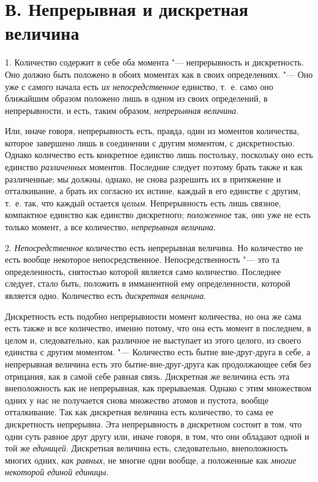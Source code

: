 \label{bkm:bm88b}
\section[В. Непрерывная и дискретная величина]{В. Непрерывная и дискретная величина}

1. Количество содержит в себе оба момента "--- непрерывность и дискретность.
Оно должно быть положено в обоих моментах как в своих определениях. "--- Оно
уже с самого начала есть {\em их непосредственное}
единство, т.~е. само оно ближайшим образом положено лишь в одном из своих
определений, в непрерывности, и есть, таким образом,
{\em непрерывная величина}.

Или, иначе говоря, непрерывность есть, правда, один из моментов количества,
которое завершено лишь в соединении с другим моментом, с дискретностью.
Однако количество есть конкретное единство лишь постольку, поскольку оно
есть единство {\em различенных} моментов. Последние
следует поэтому брать также и как различенные; мы должны, однако, не снова
разрешить их в притяжение и отталкивание, а брать их согласно их истине,
каждый в его единстве с другим, т.~е. так, что каждый остается
{\em целым}. Непрерывность есть лишь связное,
компактное единство как единство дискретного;
{\em положенное} так, оно уже не есть только момент, а
все количество, {\em непрерывная величина}.

2. {\em Непосредственное} количество есть непрерывная
величина. Но количество не есть вообще некоторое непосредственное.
Непосредственность "--- это та определенность, снятостью которой является
само количество. Последнее следует, стало быть, положить в имманентной ему
определенности, которой является одно. Количество есть
{\em дискретная величина}.

Дискретность есть подобно непрерывности момент количества, но она же сама
есть также и все количество, именно потому, что она есть момент в
последнем, в целом и, следовательно, как различное не выступает из этого
целого, из своего единства с другим моментом. "--- Количество есть бытие
вне-друг-друга в себе, а непрерывная величина есть это бытие-вне-друг-друга
как продолжающее себя без отрицания, как в самой себе равная связь.
Дискретная же величина есть эта внеположность как не непрерывная, как
прерываемая. Однако с этим множеством одних у нас не получается снова
множество атомов и пустота, вообще отталкивание. Так как дискретная
величина есть количество, то сама ее дискретность непрерывна. Эта
непрерывность в дискретном состоит в том, что одни суть равное друг другу
или, иначе говоря, в том, что они обладают одной и той же
{\em единицей}. Дискретная величина есть,
следовательно, внеположность многих одних, {\em как
равных}, не многие одни вообще, а положенные как
{\em многие некоторой единой единицы}.

